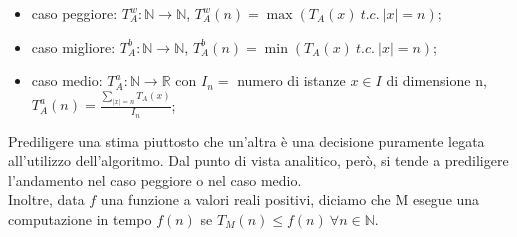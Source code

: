 \begin{itemize}
\item{caso peggiore: ${T}_{A}^w: \mathbb{N} \rightarrow \mathbb{N}$, ${T}_{A}^w(n) = \max({T}_{A}(x)\ t.c.\ |x| = n)$};
\item{caso migliore: ${T}_{A}^b: \mathbb{N} \rightarrow \mathbb{N}$, ${T}_{A}^b(n) = \min({T}_{A}(x)\ t.c.\ |x| = n)$};
\item{caso medio: ${T}_{A}^a: \mathbb{N} \rightarrow \mathbb{R}$ con $I_n = $ numero di istanze $x \in I$ di dimensione n, ${T}_{A}^a(n) = \frac{\sum \nolimits_{|x| = n} {T}_{A}(x)}{I_n}$};
\end{itemize}
Prediligere una stima piuttosto che un'altra è una decisione puramente legata all'utilizzo dell'algoritmo. Dal punto di vista analitico, però, si tende a prediligere l'andamento nel caso peggiore o nel caso medio.\\
Inoltre, data $ f $ una funzione a valori reali positivi, diciamo che M esegue una computazione in tempo $f(n)$ se $T_M(n) \leq f(n) \ \forall n \in \mathbb{N}$.
